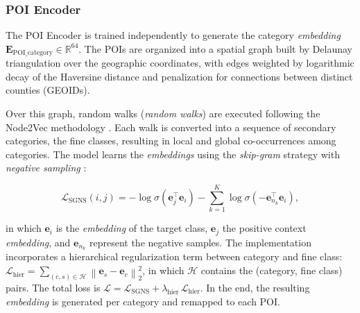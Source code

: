\subsubsection{POI Encoder}

The POI Encoder is trained independently to generate the category \textit{embedding} $\mathbf{E}_{\text{POI\_category}} \in \mathbb{R}^{64}$. The POIs are organized into a spatial graph built by Delaunay triangulation over the geographic coordinates, with edges weighted by logarithmic decay of the Haversine distance and penalization for connections between distinct counties (GEOIDs).

Over this graph, random walks (\textit{random walks}) are executed following the Node2Vec methodology \cite{grover2016node2vec}. Each walk is converted into a sequence of secondary categories, the fine classes, resulting in local and global co-occurrences among categories.
The model learns the \textit{embeddings} using the \textit{skip-gram} strategy with \textit{negative sampling} \cite{church2017word2vec}:

\[
\mathcal{L}_{\text{SGNS}}(i,j)
=
-\log \sigma\!\left(\mathbf{e}_j^\top \mathbf{e}_i\right)
-
\sum_{k=1}^{K}
\log \sigma\!\left(-\mathbf{e}_{n_k}^\top \mathbf{e}_i\right),
\]

in which $\mathbf{e}_i$ is the \textit{embedding} of the target class, $\mathbf{e}_j$ the positive context \textit{embedding}, and $\mathbf{e}_{n_k}$ represent the negative samples. The implementation incorporates a hierarchical regularization term \cite{Xu2023} between category and fine class: $\mathcal{L}_{\text{hier}} = \sum_{(c,s) \in \mathcal{H}} \left\| \mathbf{e}_s - \mathbf{e}_c \right\|_2^2$, in which $\mathcal{H}$ contains the (category, fine class) pairs.
The total loss is $\mathcal{L} = \mathcal{L}_{\text{SGNS}} + \lambda_{\text{hier}} \, \mathcal{L}_{\text{hier}}$. In the end, the resulting \textit{embedding} is generated per category and remapped to each POI.

